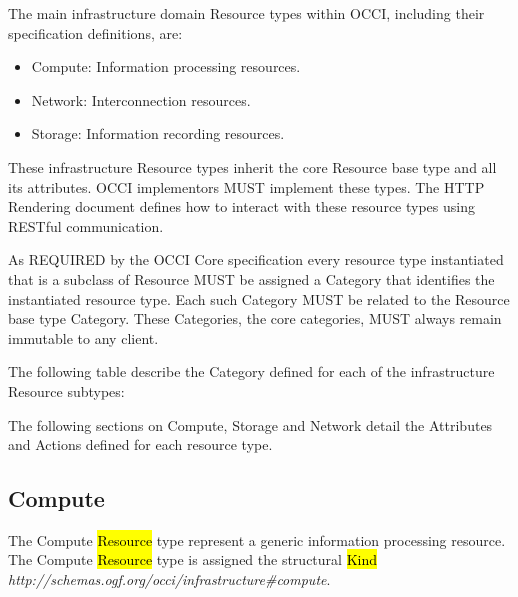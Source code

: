 \documentclass[10pt,a4paper]{article}
\begin{document}
The main infrastructure domain Resource types within OCCI, including their specification definitions, are:
\begin{itemize}
\item Compute: Information processing resources.
\item Network: Interconnection resources.
\item Storage: Information recording resources.
\end{itemize}
These infrastructure Resource types inherit the core Resource base type and all its attributes. OCCI implementors MUST implement these types. The HTTP Rendering document defines how to interact with these resource types using RESTful communication.

As REQUIRED by the OCCI Core specification every resource type instantiated that is a subclass of Resource MUST be assigned a Category that identifies the instantiated resource type. Each such Category MUST be related to the Resource base type Category. These Categories, the core categories, MUST always remain immutable to any client.

The following table describe the Category defined for each of the infrastructure Resource subtypes:


The following sections on Compute, Storage and Network detail the Attributes and Actions defined for each resource type.

\subsection{Compute}
The Compute \hl{Resource} type represent a generic information processing
resource.
The Compute \hl{Resource} type is assigned the structural \hl{Kind}
\textit{http://schemas.ogf.org/occi/infrastructure\#compute}.
\end{document}
